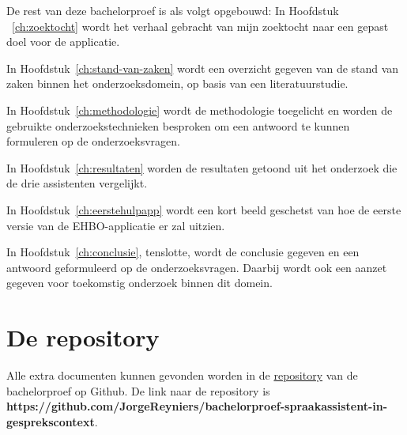 De rest van deze bachelorproef is als volgt opgebouwd:
In Hoofdstuk ~\ref{ch:zoektocht} wordt het verhaal gebracht van mijn zoektocht naar een gepast doel voor de applicatie.

In Hoofdstuk~\ref{ch:stand-van-zaken} wordt een overzicht gegeven van de stand van zaken binnen het onderzoeksdomein, op basis van een literatuurstudie.

In Hoofdstuk~\ref{ch:methodologie} wordt de methodologie toegelicht en worden de gebruikte onderzoekstechnieken besproken om een antwoord te kunnen formuleren op de onderzoeksvragen.

In Hoofdstuk~\ref{ch:resultaten} worden de resultaten getoond uit het onderzoek die de drie assistenten vergelijkt.

In Hoofdstuk~\ref{ch:eerstehulpapp} wordt een kort beeld geschetst van hoe de eerste versie van de EHBO-applicatie er zal uitzien.

In Hoofdstuk~\ref{ch:conclusie}, tenslotte, wordt de conclusie gegeven en een antwoord geformuleerd op de onderzoeksvragen. Daarbij wordt ook een aanzet gegeven voor toekomstig onderzoek binnen dit domein.

\section{De repository}
\label{s:verwijzing naar repository}
Alle extra documenten kunnen gevonden worden in de \href{https://github.com/JorgeReyniers/bachelorproef-spraakassistent-in-gesprekscontext}{repository} van de bachelorproef op Github.
De link naar de repository is \textbf{https://github.com/JorgeReyniers/bachelorproef-spraakassistent-in-gesprekscontext}.


